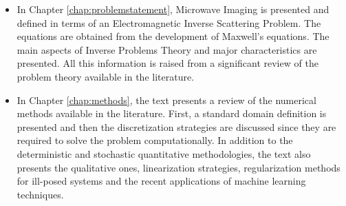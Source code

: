 		\begin{itemize}
			\item In Chapter \ref{chap:problemstatement}, Microwave Imaging is presented and defined in terms of an Electromagnetic Inverse Scattering Problem. The equations are obtained from the development of Maxwell's equations. The main aspects of Inverse Problems Theory and major characteristics are presented. All this information is raised from a significant review of the problem theory available in the literature.
			\item In Chapter \ref{chap:methods}, the text presents a review of the numerical methods available in the literature. First, a standard domain definition is presented and then the discretization strategies are discussed since they are required to solve the problem computationally. In addition to the deterministic and stochastic quantitative methodologies, the text also presents the qualitative ones, linearization strategies, regularization methods for ill-posed systems and the recent applications of machine learning techniques.

\end{itemize}
